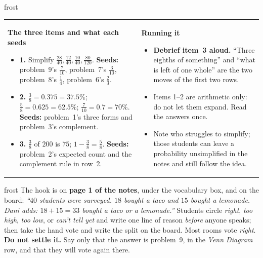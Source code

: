 \documentclass[10pt]{article}
\begin{document}
\begin{fixedskillbox}{frost}
\begin{tabularx}{\linewidth}{@{}X X@{}}
\begin{minipage}[t]{\linewidth}\vspace{0pt}
    \textbf{The three items and what each seeds}
    \begin{itemize}[leftmargin=1.1em, itemsep=1pt, topsep=2pt]
      \item \textbf{1.} Simplify $\frac{28}{40}, \frac{12}{40}, \frac{10}{40}, \frac{80}{120}$.
            \textbf{Seeds:} problem~9's $\frac{7}{10}$, problem~7's $\frac{3}{10}$, problem~8's
            $\frac14$, problem~6's $\frac23$.
      \item \textbf{2.} $\frac38 = 0.375 = 37.5\%$; $\frac58 = 0.625 = 62.5\%$; $\frac{7}{10} =
            0.7 = 70\%$. \textbf{Seeds:} problem~1's three forms and problem~3's complement.
      \item \textbf{3.} $\frac38$ of $200$ is $75$; $1 - \frac38 = \frac58$. \textbf{Seeds:}
            problem~2's expected count and the complement rule in row~2.
    \end{itemize}
\end{minipage}
&
\begin{minipage}[t]{\linewidth}\vspace{0pt}
    \textbf{Running it}
    \begin{itemize}[leftmargin=1.1em, itemsep=1pt, topsep=2pt]
      \item \textbf{Debrief item~3 aloud.} ``Three eighths of something'' and ``what is left of
            one whole'' are the two moves of the first two rows.
      \item Items 1--2 are arithmetic only: do not let them expand. Read the answers once.
      \item Note who struggles to simplify; those students can leave a probability unsimplified
            in the notes and still follow the idea.
    \end{itemize}
\end{minipage}
\end{tabularx}
\end{fixedskillbox}

\boxguard
\begin{skillbox}{frost}
The hook is on \textbf{page 1 of the notes}, under the vocabulary box, and on the board:
\textit{``$40$ students were surveyed. $18$ bought a taco and $15$ bought a lemonade. Dani adds:
$18 + 15 = 33$ bought a taco or a lemonade.''} Students circle \emph{right}, \emph{too high},
\emph{too low}, or \emph{can't tell yet} and write one line of reason \emph{before} anyone speaks;
then take the hand vote and write the split on the board. Most rooms vote \emph{right}.
\textbf{Do not settle it.} Say only that the answer is problem~9, in the \emph{Venn Diagram} row,
and that they will vote again there.
\end{skillbox}
\end{document}
